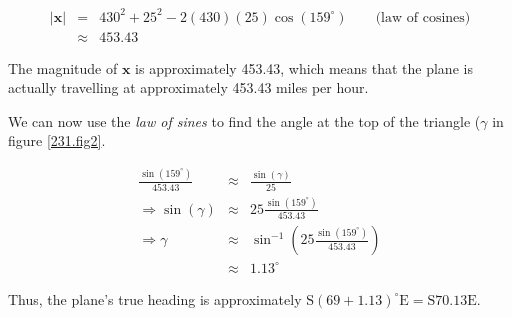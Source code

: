 \begin{eqnarray*}
	\left|\mathbf{x}\right|&=&430^2+25^2-2\left(430\right)\left(25\right)\cos\left(159^\circ\right)\qquad\mbox{(law of cosines)}\\
	&\approx&453.43
\end{eqnarray*}

The magnitude of $\mathbf{x}$ is approximately 453.43, which means that the plane is actually travelling at approximately 453.43 miles per hour.

We can now use the \emph{law of sines} to find the angle at the top of the triangle ($\gamma$ in figure \vref{231.fig2}.

\begin{eqnarray*}
	\frac{\sin\left(159^\circ\right)}{453.43}&\approx&\frac{\sin\left(\gamma\right)}{25}\\
	\Rightarrow\sin\left(\gamma\right)&\approx&25\frac{\sin\left(159^\circ\right)}{453.43}\\
	\Rightarrow\gamma&\approx&\sin^{-1}\left(25\frac{\sin\left(159^\circ\right)}{453.43}\right)\\
	&\approx&1.13^\circ
\end{eqnarray*}

Thus, the plane's true heading is approximately $\mbox{S}\left(69+1.13\right)^\circ\mbox{E}=\mbox{S}70.13\mbox{E}$.
